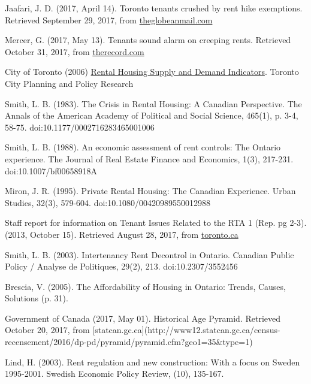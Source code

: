 \begin{thebibliography}{9}
  Jaafari, J. D. (2017, April 14). Toronto tenants crushed by rent hike exemptions. Retrieved September 29, 2017, from \href{https://beta.theglobeandmail.com/news/toronto/toronto-tenants-crushed-by-rent-hike-exemptions/article33806825/}{theglobeanmail.com}

  Mercer, G. (2017, May 13). Tenants sound alarm on creeping rents. Retrieved October 31, 2017, from \href{https://www.therecord.com/news-story/7312772-tenants-sound-alarm-on-creeping-rents/}{therecord.com}

  City of Toronto (2006) \href{https://www1.toronto.ca/city_of_toronto/social_development_finance__administration/files/pdf/housing_rental.pdf}{Rental Housing Supply and Demand Indicators}. Toronto City Planning and Policy Research

 Smith, L. B. (1983). The Crisis in Rental Housing: A Canadian Perspective. The Annals of the American Academy of Political and Social Science, 465(1), p. 3-4, 58-75. doi:10.1177/0002716283465001006

  Smith, L. B. (1988). An economic assessment of rent controls: The Ontario experience. The Journal of Real Estate Finance and Economics, 1(3), 217-231. doi:10.1007/bf00658918A

 Miron, J. R. (1995). Private Rental Housing: The Canadian Experience. Urban Studies, 32(3), 579-604. doi:10.1080/00420989550012988

  Staff report for information on Tenant Issues Related to the RTA 1 (Rep. pg 2-3). (2013, October 15). Retrieved August 28, 2017, from \href{http://www.toronto.ca/legdocs/mmis/2013/ex/bgrd/backgroundfile-63467.pdf}{toronto.ca}

 Smith, L. B. (2003). Intertenancy Rent Decontrol in Ontario. Canadian Public Policy / Analyse de Politiques, 29(2), 213. doi:10.2307/3552456

 Brescia, V. (2005). The Affordability of Housing in Ontario: Trends, Causes, Solutions (p. 31).

Government of Canada (2017, May 01). Historical Age Pyramid. Retrieved October 20, 2017, from [statcan.gc.ca](http://www12.statcan.gc.ca/census-recensement/2016/dp-pd/pyramid/pyramid.cfm?geo1=35\&type=1)

Lind, H. (2003). Rent regulation and new construction: With a focus on Sweden 1995-2001. Swedish Economic Policy Review, (10), 135-167.


\end{thebibliography}
